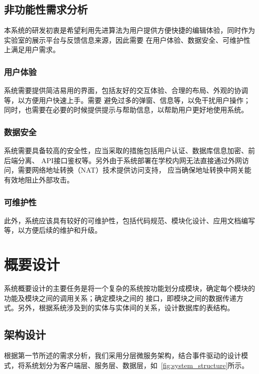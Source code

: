 \subsection{非功能性需求分析}

本系统的研发初衷是希望利用先进算法为用户提供方便快捷的编辑体验，同时作为实验室的展示平台与反馈信息来源，因此需要
在用户体验、数据安全、可维护性上满足用户需求。

\subsubsection{用户体验}

系统需要提供简洁易用的界面，包括友好的交互体验、合理的布局、外观的协调等，以方便用户快速上手。需要
避免过多的弹窗、信息等，以免干扰用户操作；同时，也需要在必要的时候提供提示与帮助信息，以帮助用户更好地使用系统。

\subsubsection{数据安全}

系统需要具备较高的安全性，应当采取的措施包括用户认证、数据库信息加密、前后端分离、
API接口鉴权等。另外由于系统部署在学校内网无法直接通过外网访问，需要网络地址转换（NAT）技术提供访问支持，
应当确保地址转换中网关能有效地阻止外部攻击。

\subsubsection{可维护性}
此外，系统应该具有较好的可维护性，包括代码规范、模块化设计、应用文档编写等，以方便后续的维护和升级。

\section{概要设计}

系统概要设计的主要任务是将一个复杂的系统按功能划分成模块，确定每个模块的功能及模块之间的调用关系；确定模块之间的
接口，即模块之间的数据传递方式。另外，根据系统涉及到的实体与实体间的关系，设计数据库的表结构。

\subsection{架构设计}

根据第一节所述的需求分析，我们采用分层微服务架构，结合事件驱动的设计模式，将系统划分为客户端层、服务层、数据层，如~\ref{fig:system_structure}所示。

